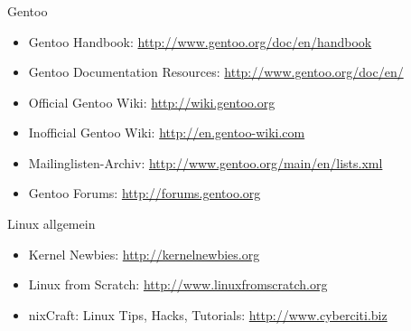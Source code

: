 \documentclass[utf8]{beamer}
\begin{document}
\begin{frame}
  \frametitle{\insertsectionhead}
  \framesubtitle{}

  \begin{block}{Gentoo}
    \begin{itemize}
      \item Gentoo Handbook: \url{http://www.gentoo.org/doc/en/handbook}
      \item Gentoo Documentation Resources: \url{http://www.gentoo.org/doc/en/}
      \item Official Gentoo Wiki: \url{http://wiki.gentoo.org}
      \item Inofficial Gentoo Wiki: \url{http://en.gentoo-wiki.com}
      \item Mailinglisten-Archiv: \url{http://www.gentoo.org/main/en/lists.xml}
      \item Gentoo Forums: \url{http://forums.gentoo.org}
    \end{itemize}
  \end{block}
  \begin{block}{Linux allgemein}
    \begin{itemize}
      \item Kernel Newbies: \url{http://kernelnewbies.org}
      \item Linux from Scratch: \url{http://www.linuxfromscratch.org}
      \item nixCraft: Linux Tips, Hacks, Tutorials: \url{http://www.cyberciti.biz}
    \end{itemize}
  \end{block}
\end{frame}
\end{document}

